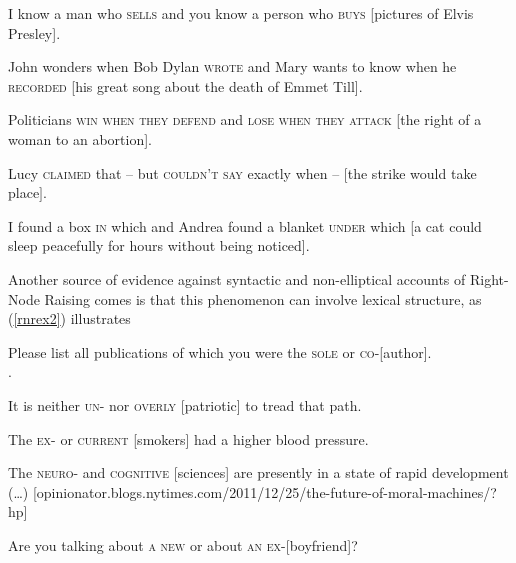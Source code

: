 \documentclass[output=paper]{langsci/langscibook}
\begin{document}
\begin{exe}
\ex
\begin{xlista}
\ex  I know a man who \textsc{sells} and you know a person who \textsc{buys}
                     [pictures of Elvis Presley].

\ex John wonders when Bob Dylan
\textsc{wrote} and Mary wants to know when
  he
\textsc{recorded} [his great song about the death of Emmet Till].
 
 \ex Politicians \textsc{win when they defend} and \textsc{lose when they attack}
[the right of a woman to an abortion].

\ex Lucy \textsc{claimed} that -- but \textsc{couldn't say}
exactly when --  $[$the strike would take place$]$.
 
 \ex I found a box \textsc{in} which and Andrea found a blanket \textsc{under}
which [a cat could sleep peacefully for hours without being
noticed].
\end{xlista}\label{rnrex1}
\end{exe}

Another source of evidence against syntactic and non-elliptical accounts of Right-Node Raising comes is that this phenomenon can involve lexical structure,
as  (\ref{rnrex2}) illustrates


\begin{exe}
\ex \begin{xlista}
\ex Please list all publications of which you were the \textsc{sole} or
\textsc{co}-[author].\\
 \citep[1325, ft.\ 44]{rodney2}.
 
\ex  It is neither \textsc{un}- nor \textsc{overly} [patriotic] to tread that path.
 
\ex The \textsc{ex-} or \textsc{current} [smokers] had a higher blood pressure.\\
\citep{chaveslp} 

\ex The \textsc{neuro}- and \textsc{cognitive} [sciences] are
presently in a state of rapid development (\ldots{})
{\small [opinionator.blogs.nytimes.com/2011/12/25/the-future-of-moral-machines/?hp]}

\ex Are you talking about \textsc{a new}  or about \textsc{an ex}-[boyfriend]?

\end{xlista}\label{rnrex2}
\end{exe}
\end{document}
